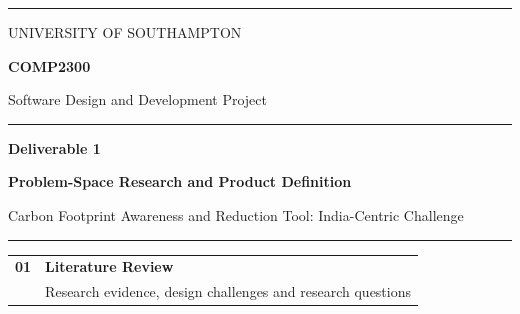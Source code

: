 \documentclass[12pt,a4paper]{article}
\begin{document}
\begin{titlepage}
\thispagestyle{empty}

\begin{center}

\vspace*{1.0cm}

{\color{AccentTeal}\rule{\textwidth}{2pt}}

\vspace{1.0cm}

{\large\textcolor{MutedGrey}{
UNIVERSITY OF SOUTHAMPTON
}}

\vspace{0.35cm}

{\Large\bfseries\textcolor{SouthamptonNavy}{
COMP2300
}}

\vspace{0.2cm}

{\large
Software Design and Development Project
}

\vspace{1.5cm}

{\color{LightGrey}\rule{0.72\textwidth}{0.8pt}}

\vspace{0.8cm}

{\Huge\bfseries\textcolor{SouthamptonNavy}{
Deliverable 1
}}

\vspace{0.3cm}

{\Large\bfseries
Problem-Space Research and Product Definition
}

\vspace{0.6cm}

{\large\textcolor{MutedGrey}{
Carbon Footprint Awareness and Reduction Tool:
India-Centric Challenge
}}

\vspace{0.8cm}

{\color{AccentTeal}\rule{0.35\textwidth}{1.5pt}}

\vspace{1.2cm}

\begin{minipage}{0.88\textwidth}
\centering

\renewcommand{\arraystretch}{1.65}
\begin{tabular}{>{\centering\arraybackslash}p{}
                >{\raggedright\arraybackslash}p{}}

\textcolor{AccentTeal}{\Large\bfseries 01} &
\textbf{Literature Review}\\
& Research evidence, design challenges and research questions\\[0.35cm]


\end{tabular}
\end{minipage}
\end{center}
\end{titlepage}
\end{document}
